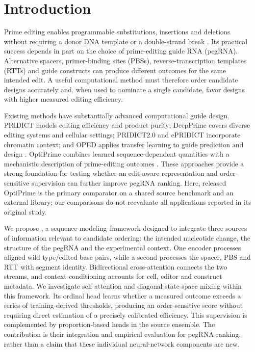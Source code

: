 \section{Introduction}
Prime editing enables programmable substitutions, insertions and deletions without requiring a donor DNA template or a double-strand break \citep{anzalone2019}. Its practical success depends in part on the choice of prime-editing guide RNA (pegRNA). Alternative spacers, primer-binding sites (PBSs), reverse-transcription templates (RTTs) and guide constructs can produce different outcomes for the same intended edit. A useful computational method must therefore order candidate designs accurately and, when used to nominate a single candidate, favor designs with higher measured editing efficiency.

Existing methods have substantially advanced computational guide design. PRIDICT models editing efficiency and product purity; DeepPrime covers diverse editing systems and cellular settings; PRIDICT2.0 and ePRIDICT incorporate chromatin context; and OPED applies transfer learning to guide prediction and design \citep{mathis2023,yu2023,mathis2025,liu2023oped}. OptiPrime combines learned sequence-dependent quantities with a mechanistic description of prime-editing outcomes \citep{hsu2026}. These approaches provide a strong foundation for testing whether an edit-aware representation and order-sensitive supervision can further improve pegRNA ranking. Here, released OptiPrime is the primary comparator on a shared source benchmark and an external library; our comparisons do not reevaluate all applications reported in its original study.

We propose \model{}, a sequence-modeling framework designed to integrate three sources of information relevant to candidate ordering: the intended nucleotide change, the structure of the pegRNA and the experimental context. One encoder processes aligned wild-type/edited base pairs, while a second processes the spacer, PBS and RTT with segment identity. Bidirectional cross-attention connects the two streams, and context conditioning accounts for cell, editor and construct metadata. We investigate self-attention and diagonal state-space mixing within this framework. Its ordinal head learns whether a measured outcome exceeds a series of training-derived thresholds, producing an order-sensitive score without requiring direct estimation of a precisely calibrated efficiency. This supervision is complemented by proportion-based heads in the source ensemble. The contribution is their integration and empirical evaluation for pegRNA ranking, rather than a claim that these individual neural-network components are new.

